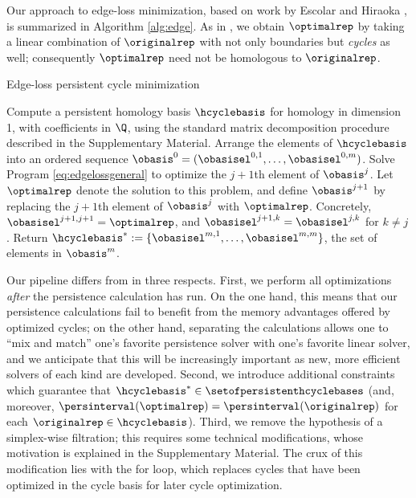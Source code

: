 Our approach to edge-loss minimization, based on work by Escolar and Hiraoka \cite{Escolar2016}, is summarized in Algorithm \ref{alg:edge}.  As in \cite{Escolar2016}, we obtain $\optimalrep$  by taking a linear combination of $\originalrep$ with not only boundaries but \emph{cycles} as well; consequently $\optimalrep$ need not be homologous to $\originalrep$.  
\begin{algorithm}
\caption{Edge-loss persistent cycle minimization}
\label{alg:edge}
\begin{algorithmic}[1]
\STATE Compute a persistent homology basis $\hcyclebasis$ for homology in dimension 1, with coefficients in $\Q$,  using the standard matrix decomposition procedure described in the Supplementary Material. Arrange the elements of $\hcyclebasis$ into an ordered sequence $\obasis^0 = (\obasisel^{0,1}, \ldots, \obasisel^{0,m})$.
\STATE Solve Program \eqref{eq:edgelossgeneral} to optimize the $j+1$th element of $\obasis^{j}$.  Let $\optimalrep$ denote the solution to this problem, and define $\obasis^{j+1}$ by replacing the $j+1$th element of $\obasis^{j}$ with $\optimalrep$.  Concretely, $\obasisel^{j+1,j+1} = \optimalrep$, and $\obasisel^{j+1,k} = \obasisel^{j,k}$ for $k \neq j$.
\ENDFOR
\STATE Return $\hcyclebasis^*: = \{\obasisel^{m,1}, \ldots, \obasisel^{m,m}\}$, the set of elements in $\obasis^m$.
\end{algorithmic}
\end{algorithm}

Our pipeline differs from \cite{Escolar2016} in three respects.  First, we perform all optimizations \emph{after} the persistence calculation has run.   On the one hand, this means that our persistence calculations  fail to  benefit from the memory advantages offered by optimized cycles; on the other hand, separating the calculations allows one to ``mix and match'' one's favorite persistence solver with one's favorite linear solver, and we anticipate that this will be increasingly important as new, more efficient solvers of each kind are developed.  Second, we introduce additional constraints which guarantee that $\hcyclebasis^* \in \setofpersistenthcyclebases$ %
(and, moreover, $\persinterval( \optimalrep) = \persinterval( \originalrep)$ for each $\originalrep \in \hcyclebasis$). Third, we remove the hypothesis of a simplex-wise filtration; this requires some technical modifications, whose motivation is explained in the Supplementary Material. The crux of this modification lies with the for loop, which replaces cycles that have been optimized in the cycle basis for later cycle optimization.

